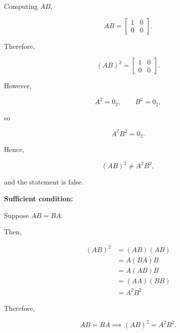 \begin{enumerate}[label=\alph*)]
\begin{answer}
    Computing $AB$,

    $$
    AB=\begin{bmatrix}
        1 & 0 \\
        0 & 0
    \end{bmatrix}.
    $$

    Therefore,

    $$
    (AB)^2=\begin{bmatrix}
        1 & 0 \\
        0 & 0
    \end{bmatrix}.
    $$

    However,

    $$
    A^2=0_2,
    \qquad B^2=0_2,
    $$

    so

    $$
    A^2B^2=0_2.
    $$

    Hence,

    $$
    (AB)^2\neq A^2B^2,
    $$

    and the statement is false.

    \par\bigskip
    \noindent\textbf{Sufficient condition:}

    Suppose $AB=BA$.

    Then,

    $$
    \begin{aligned}
        (AB)^2
        &=(AB)(AB) \\
        &=A(BA)B \\
        &=A(AB)B \\
        &=(AA)(BB) \\
        &=\boxed{A^2B^2}.
    \end{aligned}
    $$

    Therefore,

    $$
    \boxed{
        AB=BA\implies(AB)^2=A^2B^2.
    }
    $$
\end{answer}

\end{enumerate}
